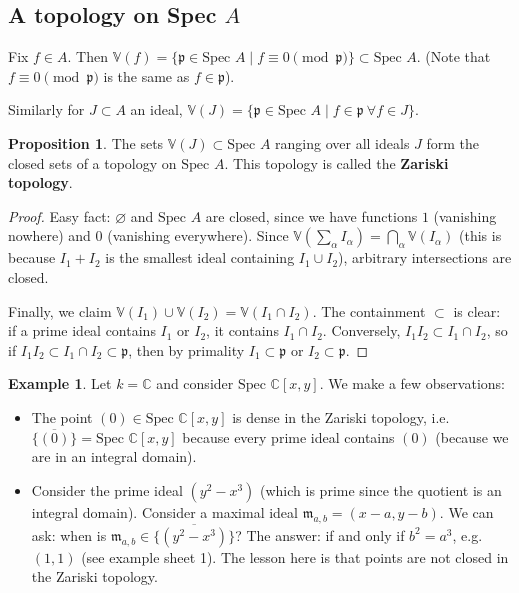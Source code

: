 \documentclass{article}
\theoremstyle{definition}
\newtheorem{prop}[theorem]{Proposition}
\newtheorem{example}{Example}[section]
\begin{document}
\subsection{A topology on Spec $A$}
Fix $f \in A$. Then $\mathbb{V}(f) = \{\mathfrak{p} \in \text{Spec }A \mid f \equiv 0 \pmod{\mathfrak{p}}\} \subset \text{Spec }A$. (Note that $f \equiv 0 \pmod{\mathfrak{p}}$ is the same as $f  \in \mathfrak{p}$). \vspace{1mm}
 
Similarly for $J \subset A$ an ideal, $\mathbb{V}(J) = \{\mathfrak{p} \in \text{Spec }A \mid f \in \mathfrak{p} ~\forall f \in J\}$.

\begin{prop}
    The sets $\mathbb{V}(J) \subset \text{Spec }A$ ranging over all ideals $J$ form the closed sets of a topology on $\text{Spec }A$. This topology is called the \textbf{Zariski topology}.
\end{prop}
\begin{proof}
    Easy fact: $\varnothing$ and $\text{Spec }A$ are closed, since we have functions $1$ (vanishing nowhere) and $0$ (vanishing everywhere). Since $\mathbb{V}(\sum_{\alpha}^{} I_\alpha) = \bigcap_\alpha \mathbb{V}(I_\alpha)$ (this is because $I_1 + I_2$ is the smallest ideal containing $I_1 \cup I_2$), arbitrary intersections are closed.
    \vspace{1mm}
     
    Finally, we claim $\mathbb{V}(I_1) \cup \mathbb{V}(I_2) = \mathbb{V}(I_1 \cap I_2)$. The containment $\subset $ is clear: if a prime ideal contains $I_1$ or $I_2$, it contains $I_1 \cap I_2$. Conversely, $I_1I_2 \subset I_1 \cap I_2$, so if $I_1 I_2 \subset I_1 \cap I_2 \subset \mathfrak{p}$, then by primality $I_1 \subset \mathfrak{p}$ or $I_2 \subset \mathfrak{p}$. 
\end{proof}

\begin{example}
    Let $k = \mathbb{C}$ and consider $\text{Spec }\mathbb{C}[x,y]$. We make a few observations:
    \begin{itemize}
        \item The point $(0) \in \text{Spec }\mathbb{C}[x,y]$ is dense in the Zariski topology, i.e. $\overline{\{(0)\}} = \text{Spec }\mathbb{C}[x,y]$ because every prime ideal contains $(0)$ (because we are in an integral domain).
        \item Consider the prime ideal $(y^2-x^3)$ (which is prime since the quotient is an integral domain). Consider a maximal ideal $\mathfrak{m}_{a,b} = (x-a, y-b)$. We can ask: when is $\mathfrak{m}_{a,b} \in \overline{\{(y^2-x^3)\}}$? The answer: if and only if $b^2 = a^3$, e.g. $(1,1)$ (see example sheet 1). The lesson here is that points are not closed in the Zariski topology.
    \end{itemize}
\end{example}
\end{document}
